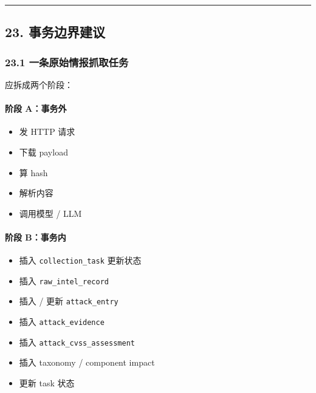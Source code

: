 \documentclass[UTF8]{ctexart}
\providecommand{\tightlist}{%
  \setlength{\itemsep}{0pt}\setlength{\parskip}{0pt}}
\begin{document}
\begin{center}\rule{0.5\linewidth}{0.5pt}\end{center}

\hypertarget{ux4e8bux52a1ux8fb9ux754cux5efaux8bae}{%
\subsection{23.
事务边界建议}\label{ux4e8bux52a1ux8fb9ux754cux5efaux8bae}}

\hypertarget{ux4e00ux6761ux539fux59cbux60c5ux62a5ux6293ux53d6ux4efbux52a1}{%
\subsubsection{23.1
一条原始情报抓取任务}\label{ux4e00ux6761ux539fux59cbux60c5ux62a5ux6293ux53d6ux4efbux52a1}}

应拆成两个阶段：

\hypertarget{ux9636ux6bb5-aux4e8bux52a1ux5916}{%
\paragraph{阶段 A：事务外}\label{ux9636ux6bb5-aux4e8bux52a1ux5916}}

\begin{itemize}
\tightlist
\item
  发 HTTP 请求
\item
  下载 payload
\item
  算 hash
\item
  解析内容
\item
  调用模型 / LLM
\end{itemize}

\hypertarget{ux9636ux6bb5-bux4e8bux52a1ux5185}{%
\paragraph{阶段 B：事务内}\label{ux9636ux6bb5-bux4e8bux52a1ux5185}}

\begin{itemize}
\tightlist
\item
  插入 \texttt{collection\_task} 更新状态
\item
  插入 \texttt{raw\_intel\_record}
\item
  插入 / 更新 \texttt{attack\_entry}
\item
  插入 \texttt{attack\_evidence}
\item
  插入 \texttt{attack\_cvss\_assessment}
\item
  插入 taxonomy / component impact
\item
  更新 task 状态
\end{itemize}
\end{document}
